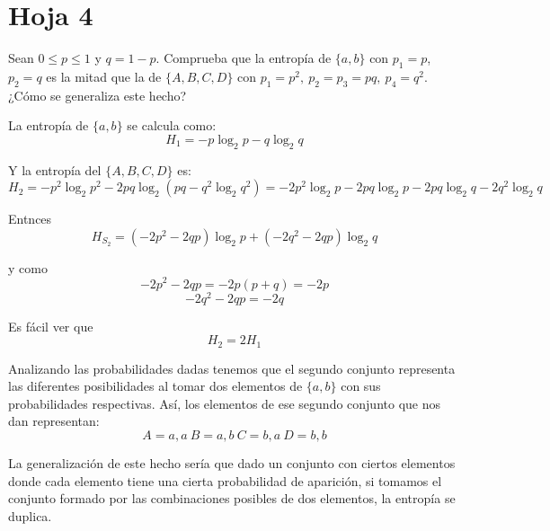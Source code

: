 \section{Hoja 4}
\begin{problem}[1]
	Sean $0 \leq p \leq 1$ y $q =1-p$. Comprueba que la entropía de $\{a,b\}$ con $p_1=p$, $p_2=q$ es la mitad que la de $\{A,B,C,D\}$ con $p_1=p^2, \ p_2=p_3=pq, \ p_4=q^2$. ¿Cómo se generaliza este hecho?
	\solution

	La entropía de $\{a,b\}$ se calcula como:
	$$H_1 = -p \log_2 p - q \log_2q$$

	Y la entropía del $\{A,B,C,D\}$ es:
	$$H_{2} = -p^2\log_2 p^2 - 2pq\log_2(pq - q^2\log_2 q^2) = -2p^2\log_2 p - 2pq\log_2p - 2pq\log_2q - 2q^2\log_2q$$

	Entnces
	$$H_{S_2}= (-2p^2-2qp)\log_2p + (-2q^2 - 2qp)\log_2q$$

	y como
	$$-2p^2-2qp= -2p(p+q) = -2p$$
	$$-2q^2 - 2qp = -2q$$

	Es fácil ver que $$H_{2} = 2H_1$$

	\yoP

	Analizando las probabilidades dadas tenemos que el segundo conjunto representa las diferentes posibilidades al tomar dos elementos de $\{a,b\}$ con sus probabilidades respectivas. Así, los elementos de ese segundo conjunto que nos dan representan:
	\[A= a,a \ B=a,b \ C=b,a \ D=b,b\]

	La generalización de este hecho sería que dado un conjunto con ciertos elementos donde cada elemento tiene una cierta probabilidad de aparición, si tomamos el conjunto formado por las combinaciones posibles de dos elementos, la entropía se duplica.

\end{problem}
